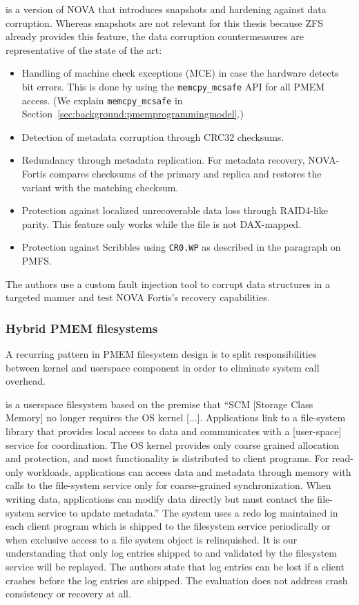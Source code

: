 \documentclass[12pt,a4paper,twoside]{book}
\begin{document}
 is a version of NOVA that introduces snapshots and hardening against data corruption.
Whereas snapshots are not relevant for this thesis because ZFS already provides this feature, the data corruption countermeasures are representative of the state of the art:
\begin{itemize}[noitemsep,beginpenalty=100000,midpenalty=100000]
    \item Handling of machine check exceptions (MCE) in case the hardware detects bit errors.
          This is done by using the \lstinline{memcpy_mcsafe} API for all PMEM access.
          (We explain \lstinline{memcpy_mcsafe} in Section~\ref{sec:background:pmemprogrammingmodel}.)
    \item Detection of metadata corruption through CRC32 checksums.
    \item Redundancy through metadata replication. For metadata recovery, NOVA-Fortis compares checksums of the primary and replica and restores the variant with the matching checksum.
    \item Protection against localized unrecoverable data loss through RAID4-like parity.
          This feature only works while the file is not DAX-mapped.
    \item Protection against Scribbles using \lstinline{CR0.WP} as described in the paragraph on PMFS.
\end{itemize}
The authors use a custom fault injection tool to corrupt data structures in a targeted manner and test NOVA Fortis's recovery capabilities.

\subsubsection{Hybrid PMEM filesystems}\label{sec:hybrid_pmem_file_systems}
A recurring pattern in PMEM filesystem design is to split responsibilities between kernel and userspace component in order to eliminate system call overhead.

 is a userspace filesystem based on the premise that
“SCM [Storage Class Memory] no longer requires the OS kernel [...].
Applications link to a file-system library that provides local access to data and communicates with a [user-space] service for coordination.
The OS kernel provides only coarse grained allocation and protection, and most functionality is distributed to client programs.
For read-only workloads, applications can access data and metadata through memory with calls to the file-system service only for coarse-grained synchronization.
When writing data, applications can modify data directly but must contact the file-system service to update metadata.”
The system uses a redo log maintained in each client program which is shipped to the filesystem service periodically or when exclusive access to a file system object is relinquished.
It is our understanding that only log entries shipped to and validated by the filesystem service will be replayed.
The authors state that log entries can be lost if a client crashes before the log entries are shipped.
The evaluation does not address crash consistency or recovery at all.
\end{document}
